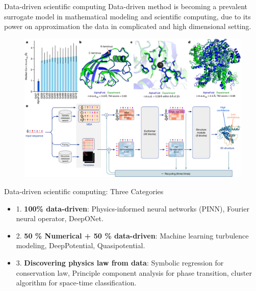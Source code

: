 \documentclass{beamer}
\begin{document}

\begin{frame}{Data-driven scientific computing}
	Data-driven method is becoming a prevalent surrogate model in mathematical modeling and scientific computing, due to its power on approximation the data in complicated and high dimensional setting.
	\begin{figure}[H]
          \centering
          \centerline{\includegraphics[width=0.7\linewidth]{fig/alphafold.png}}
        \end{figure}
\end{frame}


\begin{frame}{Data-driven scientific computing: Three Categories}
	\begin{itemize}
		\item 1. \textbf{100\% data-driven}: Physics-informed neural networks (PINN), Fourier neural operator, DeepONet.
		\item 2. \textbf{50 \% Numerical + 50 \% data-driven}: Machine learning turbulence modeling, DeepPotential, Quasipotential. 
		\item 3. \textbf{Discovering physics law from data}: Symbolic regression for conservation law, Principle component analysis for phase transition, cluster algorithm for space-time classification.
	\end{itemize}
\end{frame}
\end{document}
